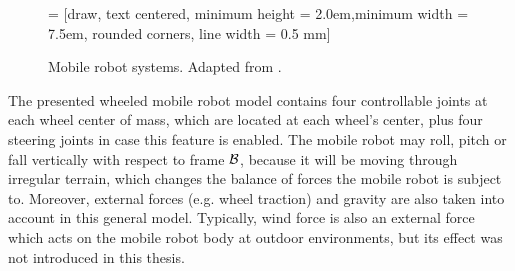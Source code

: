 \begin{figure}[!h]
	\centering
	 = [draw, text centered, minimum height = 2.0em,minimum width = 7.5em, rounded corners, line width = 0.5 mm]
	
	\caption{Mobile robot systems. Adapted from \cite{Kozlowski2004}.}
    \label{fig:mobRobotSystems}
\end{figure}

The presented wheeled mobile robot model contains four controllable joints at each wheel center of mass, which are located at each wheel's center, plus four steering joints in case this feature is enabled. The mobile robot may roll, pitch or fall vertically with respect to frame $\mathcal{B}$, because it will be moving through irregular terrain, which changes the balance of forces the mobile robot is subject to. Moreover, external forces (e.g. wheel traction) and gravity are also taken into account in this general model. Typically, wind force is also an external force which acts on the mobile robot body at outdoor environments, but its effect was not introduced in this thesis.


